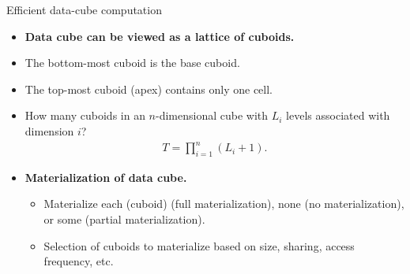 \documentclass[aspectratio=169,t]{beamer}
\begin{document}
  { 
    \begin{frame}{Efficient data-cube computation}
        \begin{itemize}
            \item \textbf{Data cube can be viewed as a lattice of cuboids.}
            \item The bottom-most cuboid is the base cuboid.
            \item The top-most cuboid (apex) contains only one cell.
            \item How many cuboids in an $n$-dimensional cube with $L_i$ levels associated with dimension $i$?
            \begin{align}
            T = \prod_{i=1}^{n} (L_i +1).
            \end{align}
            \item \textbf{{\color{airforceblue}Materialization} of data cube.}
            \begin{itemize}
              \item Materialize each (cuboid) (full materialization), none (no materialization), or some (partial materialization).
              \item Selection of cuboids to materialize based on size, sharing, access frequency, etc.
            \end{itemize}
        \end{itemize}
    \end{frame}
  }
\end{document}
